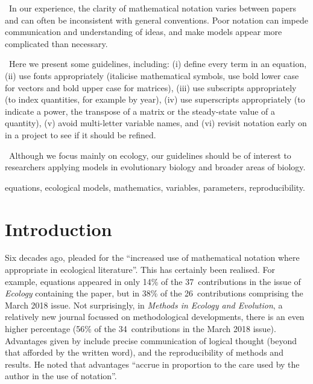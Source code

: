 \documentclass[12pt]{article}
\begin{document}
\medskip

~In our experience, the clarity of mathematical notation
varies between papers and can often be inconsistent with general conventions.
Poor notation can impede communication and understanding of ideas, and make
models appear more complicated than necessary.

\medskip

~Here we present some guidelines, including: (i) define every
term in an equation, (ii) use fonts appropriately (italicise mathematical symbols,
use bold lower case for vectors and bold upper case for matrices), (iii) use
subscripts appropriately (to index quantities, for example by year),
(iv) use superscripts appropriately
(to indicate a power, the transpose of a matrix or the steady-state value
of a quantity), (v) avoid multi-letter variable names,
and (vi) revisit notation early on in a project to see if it should be refined.

\medskip

~Although we focus mainly on ecology, our guidelines should
be of interest to researchers applying models in evolutionary biology and
broader areas of biology.



 equations, ecological models, mathematics, variables,
parameters, reproducibility.

\section*{Introduction}

Six decades ago, \citet{lowr59} pleaded for
the ``increased use of mathematical notation
where appropriate in ecological literature''. This has certainly been realised. 
For example, equations appeared in only 14\% of the 37~contributions
in the issue of \emph{Ecology} containing the \citet{lowr59} paper, but in
38\% of the 26~contributions comprising the March 2018 issue. 
Not surprisingly, in \emph{Methods in Ecology and Evolution}, a relatively new journal
focussed on methodological developments, there is an even higher percentage
(56\% of the 34~contributions 
in the March 2018 issue). 
Advantages given by \citet{lowr59} include precise communication of logical
thought (beyond that afforded by the written word), and the reproducibility 
of methods and results. He noted that advantages ``accrue in proportion to
the care used by the author in the use of notation''. 
\end{document}
